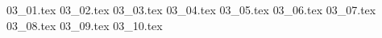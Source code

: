  {03_01.tex}
 {03_02.tex}
 {03_03.tex}
 {03_04.tex}
 {03_05.tex}
 {03_06.tex}
 {03_07.tex}
 {03_08.tex}
 {03_09.tex}
 {03_10.tex}
